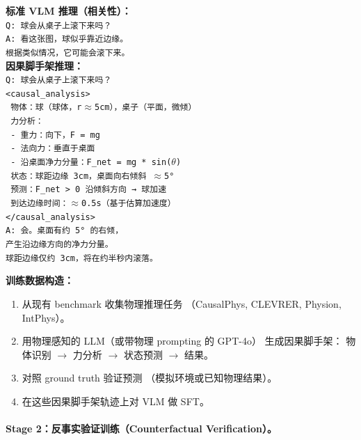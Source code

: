 \documentclass[12pt,a4paper]{article}
\begin{document}
\begin{tcolorbox}[colback=gray!5,colframe=gray!50,boxrule=0.3pt,left=4pt,right=4pt]
\small
\textbf{标准 VLM 推理（相关性）：}\\
\texttt{Q: 球会从桌子上滚下来吗？}\\
\texttt{A: 看这张图，球似乎靠近边缘。}\\
\texttt{根据类似情况，它可能会滚下来。}\\[6pt]
\textbf{因果脚手架推理：}\\
\texttt{Q: 球会从桌子上滚下来吗？}\\
\texttt{<causal\_analysis>}\\
\texttt{  物体：球（球体，r$\approx$5cm），桌子（平面，微倾）}\\
\texttt{  力分析：}\\
\texttt{    - 重力：向下，F = mg}\\
\texttt{    - 法向力：垂直于桌面}\\
\texttt{    - 沿桌面净力分量：F\_net = mg * sin($\theta$)}\\
\texttt{  状态：球距边缘 3cm，桌面向右倾斜 $\approx$5°}\\
\texttt{  预测：F\_net > 0 沿倾斜方向 → 球加速}\\
\texttt{  到达边缘时间：$\approx$0.5s（基于估算加速度）}\\
\texttt{</causal\_analysis>}\\
\texttt{A: 会。桌面有约 5° 的右倾，}\\
\texttt{产生沿边缘方向的净力分量。}\\
\texttt{球距边缘仅约 3cm，将在约半秒内滚落。}
\end{tcolorbox}

\noindent
\textbf{训练数据构造：}
\begin{enumerate}[leftmargin=2em]
  \item 从现有 benchmark 收集物理推理任务
    （CausalPhys, CLEVRER, Physion, IntPhys）。
  \item 用物理感知的 LLM（或带物理 prompting 的 GPT-4o）
    生成因果脚手架：
    物体识别 $\rightarrow$ 力分析 $\rightarrow$ 状态预测 $\rightarrow$ 结果。
  \item 对照 ground truth 验证预测
    （模拟环境或已知物理结果）。
  \item 在这些因果脚手架轨迹上对 VLM 做 SFT。
\end{enumerate}

\paragraph{Stage 2：反事实验证训练（Counterfactual Verification）。}
\end{document}

